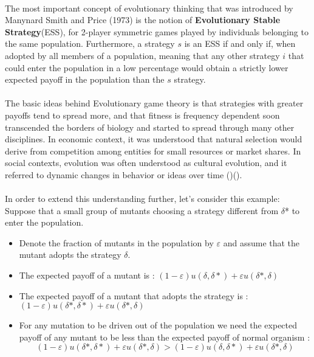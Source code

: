 \paragraph{}The most important concept of evolutionary thinking that was introduced by Manynard Smith and Price (1973) is the notion of \textbf{Evolutionary Stable Strategy}(ESS), for 2-player symmetric games played by individuals belonging to the same population. Furthermore, a strategy $s$ is an ESS if and only if, when adopted by all members of a population, meaning that any other strategy $i$ that could enter the population in a low percentage would obtain a strictly  lower expected payoff in the population than the $s$ strategy.
\paragraph{}The basic ideas behind Evolutionary game theory is that strategies with greater payoffs tend to spread more, and that fitness is frequency dependent soon transcended the borders of biology and started to spread through many other disciplines. In economic context, it was understood that natural selection would derive from competition among entities for small resources or market shares. In social contexts, evolution was often understood as cultural evolution, and it referred to dynamic changes in behavior or ideas over time (\cite{Nelson and Winter, 1982})(\cite{Boyd and Richerson, 1985}).
\paragraph{}In order to extend this understanding further, let's consider this example:
Suppose that a small group of mutants choosing a strategy different from $\delta$* to enter the population.
\begin{itemize}
\item Denote the fraction of mutants in the population by $\varepsilon$ and assume that the mutant adopts the strategy $\delta$.
\item The expected payoff of a mutant is : 
	$(1-\varepsilon)u(\delta,\delta*)+\varepsilon u(\delta*,\delta)$
\item The expected payoff of a mutant that adopts the strategy is :	\\
	$(1-\varepsilon)u(\delta*,\delta*)+\varepsilon u(\delta*,\delta)$
	\item For any mutation to be driven out of the population we need the expected payoff of any mutant to be less than the expected payoff of normal organism :\\
	\begin{equation}(1-\varepsilon)u(\delta*,\delta*)+\varepsilon u(\delta*,\delta) > (1-\varepsilon)u(\delta,\delta*)+\varepsilon u(\delta*,\delta)  \end{equation}
\end{itemize}
